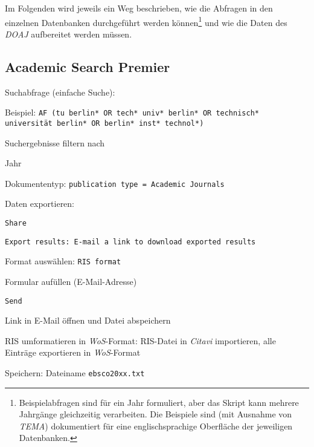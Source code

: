 Im Folgenden wird jeweils ein Weg beschrieben, wie die Abfragen in den einzelnen Datenbanken durchgeführt werden können\footnote{Beispielabfragen sind für ein Jahr formuliert, aber das Skript kann mehrere Jahrgänge gleichzeitig verarbeiten. Die Beispiele sind (mit Ausnahme von \textit{TEMA}) dokumentiert für eine englischsprachige Oberfläche der jeweiligen Datenbanken.} und wie die Daten des \textit{DOAJ} aufbereitet werden müssen.

\label{used-DBs}
\subsection*{Academic Search Premier}
\begin{compactitem}
\item Suchabfrage (einfache Suche): 
	\begin{compactitem}
	\item Beispiel: \texttt{AF (tu berlin* OR tech* univ* berlin* OR technisch* \newline universität berlin* OR berlin* inst* technol*)}
	\end{compactitem}
\item Suchergebnisse filtern nach
	\begin{compactitem}
    \item Jahr
    \item Dokumententyp: \texttt{publication type = Academic Journals}
    \end{compactitem}
\item Daten exportieren: 
	\begin{compactitem}
	\item \texttt{Share}
    \item \texttt{Export results: E-mail a link to download exported results}
    \item Format auswählen: \texttt{RIS format}
    \item Formular aufüllen (E-Mail-Adresse)
    \item \texttt{Send}
    \item Link in E-Mail öffnen und Datei abspeichern
	\end{compactitem}
\item RIS umformatieren in \textit{WoS}-Format: RIS-Datei in \textit{Citavi} importieren, alle Einträge exportieren in \textit{WoS}-Format
\item Speichern: Dateiname \texttt{ebsco20xx.txt}
\end{compactitem}

